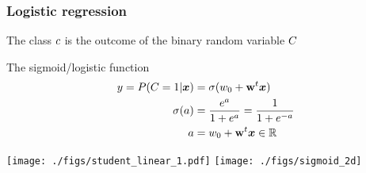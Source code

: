 \begin{frame}
\begin{columns}
\begin{column}{0.3\textwidth}
\begin{minipage}[c][0.6\textheight][c]{\textwidth}
\begin{center}
        \end{center}
        \end{minipage}
    \end{column}
  \end{columns}
\end{frame}

\begin{frame}
  \frametitle{Logistic regression}

  The class ${c}$ is the outcome of the binary random variable ${C}$
  \begin{block}{The sigmoid/logistic function}
    \begin{align*}
      y = P({C}=1 | \boldsymbol{x}) &= \sigma(w_0 + \mathbf{w}^t\boldsymbol{x}) \\
      \sigma(a)  &= \frac{e^a}{1+e^a} = \frac{1}{1+e^{-a}}\\
      a&=w_0 + \mathbf{w}^t\boldsymbol{x} \in \mathbb{R}
    \end{align*}
  \end{block}
  \begin{center}
    \texttt{[image: ./figs/student\_linear\_1.pdf]}
    \texttt{[image: ./figs/sigmoid\_2d]}
  \end{center}
\end{frame}


